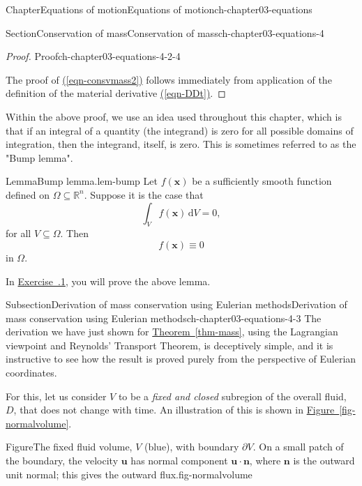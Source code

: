 \documentclass[oneside,10pt,]{book}
\newcommand{\xreffont}{\relax}
\numberwithin{equation}{section}
\newcommand{\de}{\mathrm{d}}
\newcommand{\bx}{\boldsymbol{x}}
\newcommand{\bn}{\boldsymbol{n}}
\newcommand{\bu}{\boldsymbol{u}}
\begin{document}
\begin{chapterptx}{Chapter}{Equations of motion}{}{Equations of motion}{}{}{ch-chapter03-equations}
\begin{sectionptx}{Section}{Conservation of mass}{}{Conservation of mass}{}{}{ch-chapter03-equations-4}
\begin{introduction}{}
\begin{proof}{Proof}{}{ch-chapter03-equations-4-2-4}
\par
The proof of \hyperref[eqn-consvmass2]{({\xreffont\ref{eqn-consvmass2}})} follows immediately from application of the definition of the material derivative \hyperref[eqn-DDt]{({\xreffont\ref{eqn-DDt}})}.%
\end{proof}
Within the above proof, we use an idea used throughout this chapter, which is that if an integral of a quantity (the integrand) is zero for all possible domains of integration, then the integrand, itself, is zero. This is sometimes referred to as the "Bump lemma".%
\begin{lemma}{Lemma}{Bump lemma.}{}{lem-bump}%
Let \(f(\bx)\) be a sufficiently smooth function defined on \(\Omega \subseteq
\mathbb{R}^n\). Suppose it is the case that%
\begin{equation*}
\int_V f(\bx) \, \de{V} = 0,
\end{equation*}
for all \(V \subseteq
\Omega\). Then%
\begin{equation*}
f(\bx) \equiv 0
\end{equation*}
in \(\Omega\).%
\end{lemma}
In \hyperlink{ex-bump}{Exercise~{\xreffont 3.6.1}}, you will prove the above lemma.%
\end{introduction}%
%
%
\typeout{************************************************}
\typeout{************************************************}
%
\begin{subsectionptx}{Subsection}{Derivation of mass conservation using Eulerian methods}{}{Derivation of mass conservation using Eulerian methods}{}{}{ch-chapter03-equations-4-3}
The derivation we have just shown for \hyperref[thm-mass]{Theorem~{\xreffont\ref{thm-mass}}}, using the Lagrangian viewpoint and Reynolds' Transport Theorem, is deceptively simple, and it is instructive to see how the result is proved purely from the perspective of Eulerian coordinates.%
\par
For this, let us consider \(V\) to be a \emph{fixed and closed} subregion of the overall fluid, \(D\), that does not change with time. An illustration of this is shown in \hyperref[fig-normalvolume]{Figure~{\xreffont\ref{fig-normalvolume}}}.%
\begin{figureptx}{Figure}{The fixed fluid volume, \(V\) (blue), with boundary \(\partial V\). On a small patch of the boundary, the velocity \(\bu\) has normal component \(\bu \cdot
\bn\), where \(\bn\) is the outward unit normal; this gives the outward flux.}{fig-normalvolume}{}%

\end{figureptx}
\end{subsectionptx}
\end{sectionptx}
\end{chapterptx}
\end{document}
